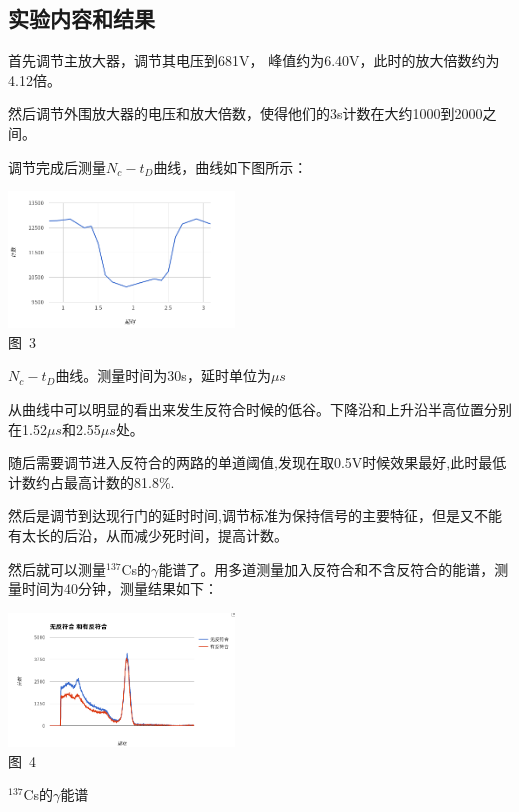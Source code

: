 \documentclass[a4paper,10.0pt,twoside]{npr}
\begin{document}
\begin{multicols}{2}
\section{实验内容和结果}
首先调节主放大器，调节其电压到681V， 峰值约为6.40V，此时的放大倍数约为4.12倍。

然后调节外围放大器的电压和放大倍数，使得他们的3s计数在大约1000到2000之间。

调节完成后测量$N_c-t_D$曲线，曲线如下图所示：

\begin{center}
   \includegraphics[width=0.45\textwidth]{1.png}
\\
\xiaowu\song 图~3\begin{minipage}[t]{75mm} \quad $N_c-t_D$曲线。测量时间为30s，延时单位为$\mu s$\\[-1mm]\wuhao
\end{minipage}
\end{center}

从曲线中可以明显的看出来发生反符合时候的低谷。下降沿和上升沿半高位置分别在1.52$\mu s$和2.55$\mu s$处。

随后需要调节进入反符合的两路的单道阈值,发现在取0.5V时候效果最好,此时最低计数约占最高计数的81.8\%.

然后是调节到达现行门的延时时间,调节标准为保持信号的主要特征，但是又不能有太长的后沿，从而减少死时间，提高计数。

然后就可以测量$^{137}$Cs的$\gamma$能谱了。用多道测量加入反符合和不含反符合的能谱，测量时间为40分钟，测量结果如下：

\begin{center}
   \includegraphics[width=0.45\textwidth]{2.png}
\\
\xiaowu\song 图~4\begin{minipage}[t]{75mm} $^{137}$Cs的$\gamma$能谱\quad \\[-1mm]\wuhao
\end{minipage}
\end{center}


\end{multicols}
\end{document}

